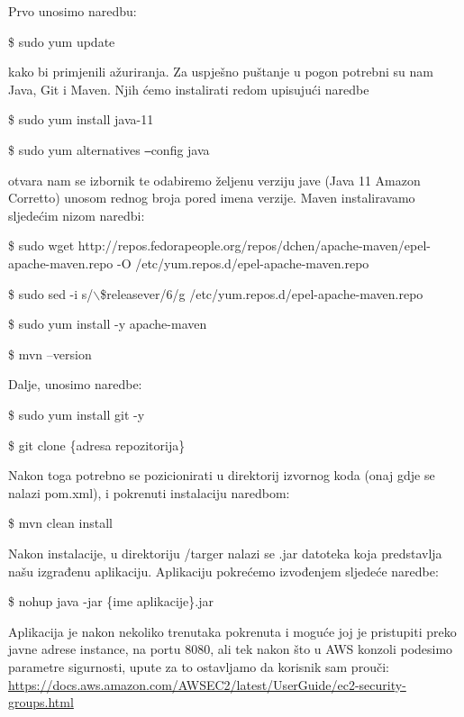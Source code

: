 			
			\noindent Prvo unosimo naredbu:
			\begin{center}
				\$ sudo yum update
			\end{center}
				kako bi primjenili ažuriranja. Za uspješno puštanje u pogon potrebni su nam Java, Git i Maven. Njih ćemo instalirati redom upisujući naredbe
				\begin{center}
					\$ sudo yum install java-11
				\end{center}
			\begin{center}
				\$ sudo yum alternatives  \texttt{--}config java
			\end{center}
			otvara nam se izbornik te odabiremo željenu verziju jave (Java 11 Amazon Corretto) unosom rednog broja pored imena verzije.
			Maven instaliravamo sljedećim nizom naredbi:
			\begin{center}
				\$ sudo wget http://repos.fedorapeople.org/repos/dchen/apache-maven/epel-apache-maven.repo -O /etc/yum.repos.d/epel-apache-maven.repo
				
				\$ sudo sed -i s/$\backslash$\$releasever/6/g /etc/yum.repos.d/epel-apache-maven.repo
				
				\$ sudo yum install -y apache-maven
			
				\$ mvn --version
			\end{center}
			Dalje, unosimo naredbe:
			\begin{center}
				\$ sudo yum install git -y
				
				\$ git clone \{adresa repozitorija\}
			\end{center}
			Nakon toga potrebno se pozicionirati u direktorij izvornog koda (onaj gdje se nalazi pom.xml), i pokrenuti instalaciju naredbom:
			\begin{center}
				\$ mvn clean install
			\end{center}
			Nakon instalacije, u direktoriju /targer nalazi se .jar datoteka koja predstavlja našu izgrađenu aplikaciju. Aplikaciju pokrećemo izvođenjem sljedeće naredbe:
			\begin{center}
				\$ nohup java -jar \{ime aplikacije\}.jar
			\end{center}
			Aplikacija je nakon nekoliko trenutaka pokrenuta i moguće joj je pristupiti preko javne adrese instance, na portu 8080, ali tek nakon što u AWS konzoli podesimo parametre sigurnosti, upute za to ostavljamo da korisnik sam prouči: \url{https://docs.aws.amazon.com/AWSEC2/latest/UserGuide/ec2-security-groups.html}
		
		
		
